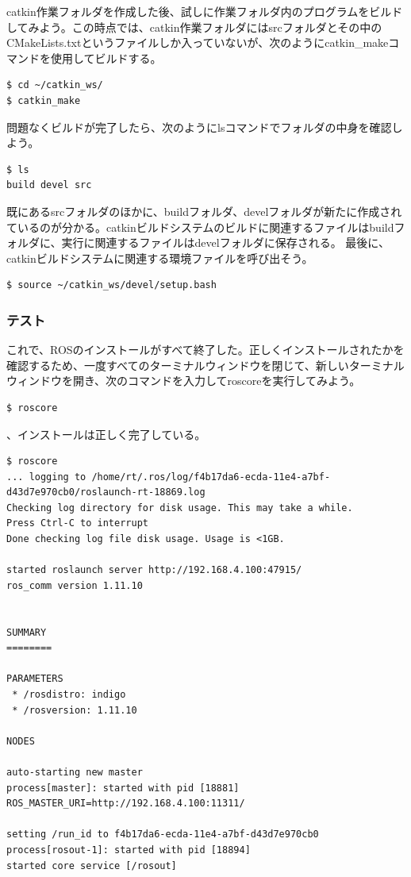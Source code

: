 catkin作業フォルダを作成した後、試しに作業フォルダ内のプログラムをビルドしてみよう。この時点では、catkin作業フォルダにはsrcフォルダとその中のCMakeLists.txtというファイルしか入っていないが、次のようにcatkin\_makeコマンドを使用してビルドする。

\begin{lstlisting}[language=ROS]
$ cd ~/catkin_ws/
$ catkin_make
\end{lstlisting}

問題なくビルドが完了したら、次のようにlsコマンドでフォルダの中身を確認しよう。

\begin{lstlisting}[language=ROS]
$ ls
build devel src
\end{lstlisting}

既にあるsrcフォルダのほかに、buildフォルダ、develフォルダが新たに作成されているのが分かる。catkinビルドシステムのビルドに関連するファイルはbuildフォルダに、実行に関連するファイルはdevelフォルダに保存される。
最後に、catkinビルドシステムに関連する環境ファイルを呼び出そう。

\begin{lstlisting}[language=ROS]
$ source ~/catkin_ws/devel/setup.bash
\end{lstlisting}

\subsubsection{テスト}
これで、ROSのインストールがすべて終了した。正しくインストールされたかを確認するため、一度すべてのターミナルウィンドウを閉じて、新しいターミナルウィンドウを開き、次のコマンドを入力してroscoreを実行してみよう。

\begin{lstlisting}[language=ROS]
$ roscore
\end{lstlisting}

、インストールは正しく完了している。

\begin{lstlisting}[language=ROS]
$ roscore
... logging to /home/rt/.ros/log/f4b17da6-ecda-11e4-a7bf-d43d7e970cb0/roslaunch-rt-18869.log
Checking log directory for disk usage. This may take a while.
Press Ctrl-C to interrupt
Done checking log file disk usage. Usage is <1GB.

started roslaunch server http://192.168.4.100:47915/
ros_comm version 1.11.10


SUMMARY
========

PARAMETERS
 * /rosdistro: indigo
 * /rosversion: 1.11.10

NODES

auto-starting new master
process[master]: started with pid [18881]
ROS_MASTER_URI=http://192.168.4.100:11311/

setting /run_id to f4b17da6-ecda-11e4-a7bf-d43d7e970cb0
process[rosout-1]: started with pid [18894]
started core service [/rosout]
\end{lstlisting}

